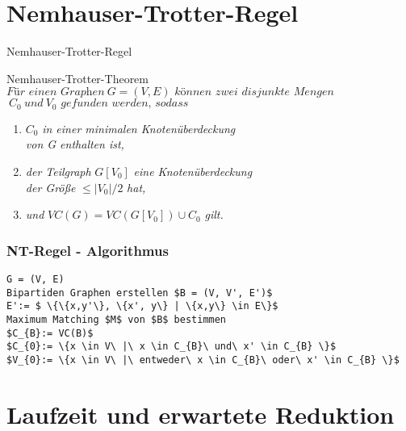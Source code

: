 \documentclass{beamer}
\begin{document}
	\section{Nemhauser-Trotter-Regel}
	
	\begin{frame}{Nemhauser-Trotter-Regel}
\begin{block}{Nemhauser-Trotter-Theorem}
$\textit{Für einen Graphen}\ G=(V,E)\textit{ können zwei disjunkte Mengen}$\\ $\ C_{0}\ und\ V_{0} \textit{ gefunden werden, sodass}$
\begin{enumerate}
\item $C_{0}$ \textit{ in einer minimalen Knotenüberdeckung} \\ 
\textit{von G enthalten ist,}
\item \textit{der Teilgraph }$G[V_{0}]$ \textit{eine Knotenüberdeckung}\\
\textit{der Größe} $\leq |V_{0}| / 2$ \textit{ hat,}
\item \textit{und} $VC(G) = VC(G[V_{0}])\cup C_{0}$ \textit{ gilt.}
\end{enumerate}

\end{block}
	\end{frame}
	
\begin{frame}[fragile]
\frametitle{NT-Regel - Algorithmus}
\begin{lstlisting}[mathescape = true]
G = (V, E)
Bipartiden Graphen erstellen $B = (V, V', E')$
E':= $ \{\{x,y'\}, \{x', y\} | \{x,y\} \in E\}$
Maximum Matching $M$ von $B$ bestimmen
$C_{B}:= VC(B)$
$C_{0}:= \{x \in V\ |\ x \in C_{B}\ und\ x' \in C_{B} \}$
$V_{0}:= \{x \in V\ |\ entweder\ x \in C_{B}\ oder\ x' \in C_{B} \}$
\end{lstlisting}
\end{frame}
	
	\section{Laufzeit und erwartete Reduktion}
	\begin{frame}{}
	\end{frame}
\end{document}
